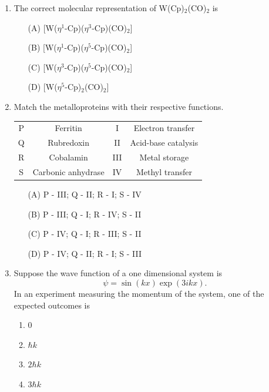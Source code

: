 \documentclass[journal,12pt,onecolumn]{IEEEtran}
\theoremstyle{remark}
\begin{document}
\begin{enumerate}
\item The correct molecular representation of W(Cp)$_2$(CO)$_2$ is \hfill{}

\begin{enumerate}
\item [(A)] [W($\eta^1$-Cp)($\eta^3$-Cp)(CO)$_2$]
\item [(B)] [W($\eta^1$-Cp)($\eta^5$-Cp)(CO)$_2$]
\item [(C)] [W($\eta^3$-Cp)($\eta^5$-Cp)(CO)$_2$]
\item [(D)] [W($\eta^5$-Cp)$_2$(CO)$_2$]
\end{enumerate}




\item Match the metalloproteins with their respective functions. \hfill{}

\begin{center}
\begin{tabular}{|c|c|c|c|}
\hline
P & Ferritin & I & Electron transfer \\
Q & Rubredoxin & II & Acid-base catalysis \\
R & Cobalamin & III & Metal storage \\
S & Carbonic anhydrase & IV & Methyl transfer \\
\hline
\end{tabular}
\end{center}

\begin{multicols}{2}
\begin{enumerate}
\item [(A)] P - III; Q - II; R - I; S - IV
\item [(B)] P - III; Q - I; R - IV; S - II
\item [(C)] P - IV; Q - I; R - III; S - II
\item [(D)] P - IV; Q - II; R - I; S - III
\end{enumerate}
\end{multicols}

\newpage


\item Suppose the wave function of a one dimensional system is 
\[
\psi = \sin(kx) \exp(3ikx).
\]
In an experiment measuring the momentum of the system, one of the expected outcomes is \hfill{}
\begin{multicols}{4}
\begin{enumerate}
\item 0
\item $\hbar k$
\item $2 \hbar k$
\item $3 \hbar k$
\end{enumerate}
\end{multicols}






\end{enumerate}
\end{document}
